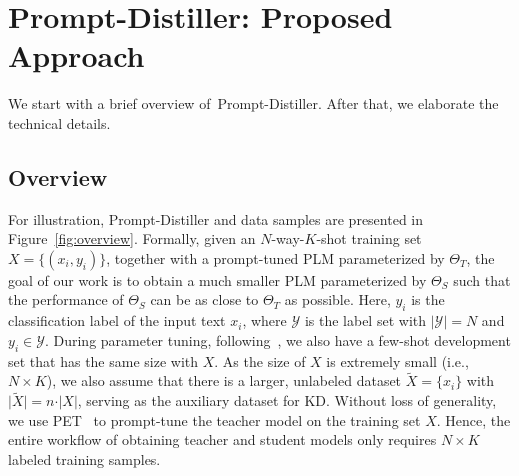 \documentclass{article}
\begin{document}
\section{Prompt-Distiller: Proposed Approach}

We start with a brief overview of~{Prompt-Distiller}. After that, we elaborate the technical details.


\subsection{Overview}

For illustration, Prompt-Distiller and data samples are presented in Figure~\ref{fig:overview}.
Formally, given an $N$-way-$K$-shot training set $X=\{(x_i,y_i)\}$, together with a prompt-tuned PLM parameterized by ${\Theta}_{T}$, the goal of our work is to obtain a much smaller PLM parameterized by ${\Theta}_{S}$ such that the performance of ${\Theta}_{S}$ can be as close to ${\Theta}_{T}$ as possible.
Here, $y_i$ is the classification label of the input text $x_i$, where $\mathcal{Y}$ is the label set with $\vert\mathcal{Y}\vert=N$ and $y_i\in\mathcal{Y}$.
During parameter tuning, following~\cite{DBLP:conf/acl/GaoFC20}, we also have a few-shot development set that has the same size with $X$.
As the size of $X$ is extremely small (i.e.,~$N\times K$),
we also assume that there is a larger, unlabeled dataset $\tilde{X}=\{x_i\}$ with $\vert\tilde{X}\vert=n\cdot\vert X\vert$, serving as the auxiliary dataset for KD.
Without loss of generality, we use PET~\cite{DBLP:conf/eacl/SchickS21} to prompt-tune the teacher model on the training set $X$.
Hence, the entire workflow of obtaining teacher and student models only requires $N\times K$ labeled training samples.

\end{document}
